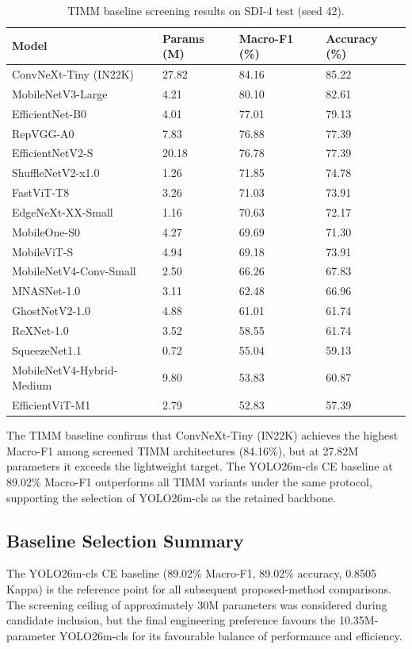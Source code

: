 \begin{table}[htbp]
\centering
\caption{TIMM baseline screening results on SDI-4 test (seed 42).}
\label{tab:timm-baseline}
\begin{tabular}{l C{1.5cm} C{1.8cm} C{1.8cm}}
\toprule
\textbf{Model} & \textbf{Params (M)} & \textbf{Macro-F1 (\%)} & \textbf{Accuracy (\%)} \\
\midrule
ConvNeXt-Tiny (IN22K) & 27.82 & 84.16 & 85.22 \\
MobileNetV3-Large     & 4.21  & 80.10 & 82.61 \\
EfficientNet-B0       & 4.01  & 77.01 & 79.13 \\
RepVGG-A0             & 7.83  & 76.88 & 77.39 \\
EfficientNetV2-S      & 20.18 & 76.78 & 77.39 \\
ShuffleNetV2-x1.0     & 1.26  & 71.85 & 74.78 \\
FastViT-T8            & 3.26  & 71.03 & 73.91 \\
EdgeNeXt-XX-Small     & 1.16  & 70.63 & 72.17 \\
MobileOne-S0          & 4.27  & 69.69 & 71.30 \\
MobileViT-S           & 4.94  & 69.18 & 73.91 \\
MobileNetV4-Conv-Small & 2.50 & 66.26 & 67.83 \\
MNASNet-1.0           & 3.11  & 62.48 & 66.96 \\
GhostNetV2-1.0        & 4.88  & 61.01 & 61.74 \\
ReXNet-1.0            & 3.52  & 58.55 & 61.74 \\
SqueezeNet1.1         & 0.72  & 55.04 & 59.13 \\
MobileNetV4-Hybrid-Medium & 9.80 & 53.83 & 60.87 \\
EfficientViT-M1       & 2.79  & 52.83 & 57.39 \\
\bottomrule
\end{tabular}
\end{table}

The TIMM baseline confirms that ConvNeXt-Tiny (IN22K) achieves the highest Macro-F1 among screened TIMM architectures (84.16\%), but at 27.82M parameters it exceeds the lightweight target. The YOLO26m-cls CE baseline at 89.02\% Macro-F1 outperforms all TIMM variants under the same protocol, supporting the selection of YOLO26m-cls as the retained backbone.

\subsection{Baseline Selection Summary}
\label{sec:baseline-selection}

The YOLO26m-cls CE baseline (89.02\% Macro-F1, 89.02\% accuracy, 0.8505 Kappa) is the reference point for all subsequent proposed-method comparisons. The screening ceiling of approximately 30M parameters was considered during candidate inclusion, but the final engineering preference favours the 10.35M-parameter YOLO26m-cls for its favourable balance of performance and efficiency.